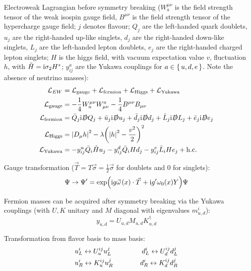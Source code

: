 			Electroweak Lagrangian before symmetry breaking ($W_a^{\mu\nu}$ is the field strength tensor of the weak isospin gauge field, $B^{\mu\nu}$ is the field strength tensor of the hypercharge gauge field; $j$ denotes flavour; $Q_j$ are the left-handed quark doublets, $u_j$ are the right-handed up-like singlets, $d_j$ are the right-handed down-like singlets, $L_j$ are the left-handed lepton doublets, $e_j$ are the right-handed charged lepton singlets; $H$ is the higgs field, with vacuum expectation value $v$, fluctuation $h$, with $\tilde{H}=\mathrm{i}\sigma_2 H^{*}$; $y^a_{ij}$ are the Yukawa couplings for $a \in \set{u,d,e}$. Note the absence of neutrino masses):
			\begin{equation}
				\begin{aligned}
					\mathcal{L}_{EW} &= \mathcal{L}_{\text{gauge}} + \mathcal{L}_{\text{fermion}} + \mathcal{L}_{\text{Higgs}} + \mathcal{L}_{\text{Yukawa}} \\
					\mathcal{L}_{\text{gauge}} &= -\frac{1}{4} W_a^{\mu\nu} W^a_{\mu\nu} -\frac{1}{4} B^{\mu\nu} B_{\mu\nu} \\
					\mathcal{L}_{\text{fermion}} &= \bar{Q}_j \mathrm{i} \slashed{D} Q_j + \bar{u}_j \mathrm{i} \slashed{D} u_j + \bar{d}_j \mathrm{i} \slashed{D} d_j + \bar{L}_j \mathrm{i} \slashed{D} L_j + \bar{e}_j \mathrm{i} \slashed{D} e_j \\
					\mathcal{L}_{\text{Higgs}} &= \abs{D_\mu h}^2 - \lambda\qty(\abs{h}^2 -\frac{v^2}{2})^2 \\
					\mathcal{L}_{\text{Yukawa}} &= - y^u_{ij} \bar{Q}_{i} \tilde{H}  u_j - y^d_{ij} \bar{Q}_i H d_j - y^e_{ij} \bar{L}_i H e_j + \text{h.c.}
				\end{aligned}
			\end{equation}

			\noindent
			Gauge transformation ($\vec{T}=T\vec{\sigma}=\frac{1}{2}\vec{\sigma}$ for doublets and $0$ for singlets):
			\begin{equation}
				\Psi \to \Psi' = \exp(\i g \vec{\omega}(x)\cdot\vec{T}	+ \i g' \omega_0(x) Y) \Psi
			\end{equation}

			\noindent
			Fermion masses can be acquired after symmetry breaking via the Yukawa couplings (with $U,K$ unitary and $M$ diagonal with eigenvalues $m_{u,d}^i$):
			\begin{equation}
				y_{u,d} = U_{u,d} M_{u,d} K_{u,d}^\dagger
			\end{equation}

			\noindent
			Transformation from flavor basis to mass basis:
			\begin{equation}
				\begin{aligned}
					&u_L^i \leftrightarrow U^{ij}_u u_L^j
					\hspace{30pt}
					&d_L^i \leftrightarrow U^{ij}_d d_L^j
					\\
					&u_R^i \leftrightarrow K^{ij}_u u_R^j
					\hspace{30pt}
					&d_R^i \leftrightarrow K^{ij}_d d_R^j
				\end{aligned}
			\end{equation}

